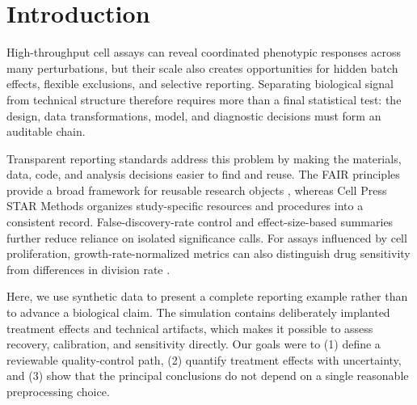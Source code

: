 \section{Introduction}
High-throughput cell assays can reveal coordinated phenotypic responses across
many perturbations, but their scale also creates opportunities for hidden batch
effects, flexible exclusions, and selective reporting. Separating biological
signal from technical structure therefore requires more than a final statistical
test: the design, data transformations, model, and diagnostic decisions must form
an auditable chain.

Transparent reporting standards address this problem by making the materials,
data, code, and analysis decisions easier to find and reuse. The FAIR principles
provide a broad framework for reusable research objects \citep{wilkinson2016},
whereas Cell Press STAR Methods organizes study-specific resources and procedures
into a consistent record. False-discovery-rate control \citep{benjamini1995} and
effect-size-based summaries further reduce reliance on isolated significance
calls. For assays influenced by cell proliferation, growth-rate-normalized
metrics can also distinguish drug sensitivity from differences in division rate
\citep{hafner2016}.

Here, we use synthetic data to present a complete reporting example rather than
to advance a biological claim. The simulation contains deliberately implanted
treatment effects and technical artifacts, which makes it possible to assess
recovery, calibration, and sensitivity directly. Our goals were to (1) define a
reviewable quality-control path, (2) quantify treatment effects with uncertainty,
and (3) show that the principal conclusions do not depend on a single reasonable
preprocessing choice.

